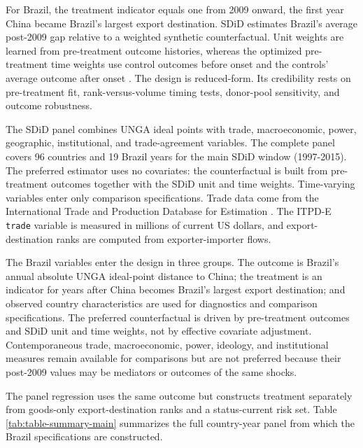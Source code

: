 \documentclass[referee,pdflatex,sn-basic]{sn-jnl}
\theoremstyle{thmstylethree}
\begin{document}
For Brazil, the treatment indicator equals one from 2009 onward, the first year China became Brazil's largest export destination. SDiD estimates Brazil's average post-2009 gap relative to a weighted synthetic counterfactual. Unit weights are learned from pre-treatment outcome histories, whereas the optimized pre-treatment time weights use control outcomes before onset and the controls' average outcome after onset \citep{arkhangelsky_etal2021}. The design is reduced-form. Its credibility rests on pre-treatment fit, rank-versus-volume timing tests, donor-pool sensitivity, and outcome robustness.

The SDiD panel combines UNGA ideal points with trade, macroeconomic, power, geographic, institutional, and trade-agreement variables. The complete panel covers 96 countries and 19 Brazil years for the main SDiD window (1997-2015). The preferred estimator uses no covariates: the counterfactual is built from pre-treatment outcomes together with the SDiD unit and time weights. Time-varying variables enter only comparison specifications. Trade data come from the International Trade and Production Database for Estimation \citep{borchert_etal2021}. The ITPD-E \texttt{trade} variable is measured in millions of current US dollars, and export-destination ranks are computed from exporter-importer flows.

The Brazil variables enter the design in three groups. The outcome is Brazil's annual absolute UNGA ideal-point distance to China; the treatment is an indicator for years after China becomes Brazil's largest export destination; and observed country characteristics are used for diagnostics and comparison specifications. The preferred counterfactual is driven by pre-treatment outcomes and SDiD unit and time weights, not by effective covariate adjustment. Contemporaneous trade, macroeconomic, power, ideology, and institutional measures remain available for comparisons but are not preferred because their post-2009 values may be mediators or outcomes of the same shocks.

The panel regression uses the same outcome but constructs treatment separately from goods-only export-destination ranks and a status-current risk set. Table \ref{tab:table-summary-main} summarizes the full country-year panel from which the Brazil specifications are constructed.
\end{document}

